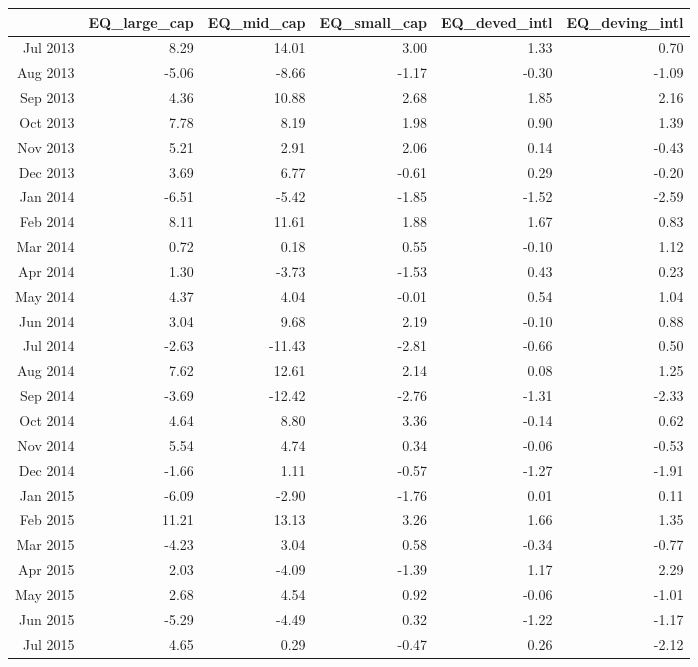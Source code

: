 \begin{tabularx}{\textwidth}{rrrrrr}
  \hline
 & EQ\_large\_cap & EQ\_mid\_cap & EQ\_small\_cap & EQ\_deved\_intl & EQ\_deving\_intl \\ 
  \hline
Jul 2013 & 8.29 & 14.01 & 3.00 & 1.33 & 0.70 \\ 
  Aug 2013 & -5.06 & -8.66 & -1.17 & -0.30 & -1.09 \\ 
  Sep 2013 & 4.36 & 10.88 & 2.68 & 1.85 & 2.16 \\ 
  Oct 2013 & 7.78 & 8.19 & 1.98 & 0.90 & 1.39 \\ 
  Nov 2013 & 5.21 & 2.91 & 2.06 & 0.14 & -0.43 \\ 
  Dec 2013 & 3.69 & 6.77 & -0.61 & 0.29 & -0.20 \\ 
  Jan 2014 & -6.51 & -5.42 & -1.85 & -1.52 & -2.59 \\ 
  Feb 2014 & 8.11 & 11.61 & 1.88 & 1.67 & 0.83 \\ 
  Mar 2014 & 0.72 & 0.18 & 0.55 & -0.10 & 1.12 \\ 
  Apr 2014 & 1.30 & -3.73 & -1.53 & 0.43 & 0.23 \\ 
  May 2014 & 4.37 & 4.04 & -0.01 & 0.54 & 1.04 \\ 
  Jun 2014 & 3.04 & 9.68 & 2.19 & -0.10 & 0.88 \\ 
  Jul 2014 & -2.63 & -11.43 & -2.81 & -0.66 & 0.50 \\ 
  Aug 2014 & 7.62 & 12.61 & 2.14 & 0.08 & 1.25 \\ 
  Sep 2014 & -3.69 & -12.42 & -2.76 & -1.31 & -2.33 \\ 
  Oct 2014 & 4.64 & 8.80 & 3.36 & -0.14 & 0.62 \\ 
  Nov 2014 & 5.54 & 4.74 & 0.34 & -0.06 & -0.53 \\ 
  Dec 2014 & -1.66 & 1.11 & -0.57 & -1.27 & -1.91 \\ 
  Jan 2015 & -6.09 & -2.90 & -1.76 & 0.01 & 0.11 \\ 
  Feb 2015 & 11.21 & 13.13 & 3.26 & 1.66 & 1.35 \\ 
  Mar 2015 & -4.23 & 3.04 & 0.58 & -0.34 & -0.77 \\ 
  Apr 2015 & 2.03 & -4.09 & -1.39 & 1.17 & 2.29 \\ 
  May 2015 & 2.68 & 4.54 & 0.92 & -0.06 & -1.01 \\ 
  Jun 2015 & -5.29 & -4.49 & 0.32 & -1.22 & -1.17 \\ 
  Jul 2015 & 4.65 & 0.29 & -0.47 & 0.26 & -2.12 \\ 

\end{tabularx}
